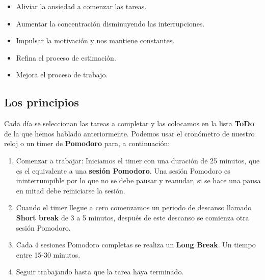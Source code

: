 \begin{itemize}
	\item Aliviar la ansiedad a comenzar las tareas.
	\item Aumentar la concentración disminuyendo las interrupciones.
	\item Impulsar la motivación y nos mantiene constantes.
	\item Refina el proceso de estimación.
	\item Mejora el proceso de trabajo.
\end{itemize}

\subsection{Los principios}

Cada día se seleccionan las tareas a completar y las colocamos en la lista \textbf{ToDo} de la que hemos hablado anteriormente. Podemos usar el cronómetro de nuestro reloj o un timer de \textbf{Pomodoro} para, a continuación:

\begin{enumerate}
	\item Comenzar a trabajar: Iniciamos el timer con una duración de 25 minutos, que es el equivalente a una \textbf{sesión Pomodoro}. Una sesión Pomodoro es ininterrumpible por lo que no se debe pausar y reanudar, si se hace una pausa en mitad debe reiniciarse la sesión.
	\item Cuando el timer llegue a cero comenzamos un periodo de descanso llamado \textbf{Short break} de 3 a 5 minutos, después de este descanso se comienza otra sesión Pomodoro.
	\item Cada 4 sesiones Pomodoro completas se realiza un \textbf{Long Break}. Un tiempo entre 15-30 minutos.
	\item Seguir trabajando hasta que la tarea haya terminado.
\end{enumerate}


